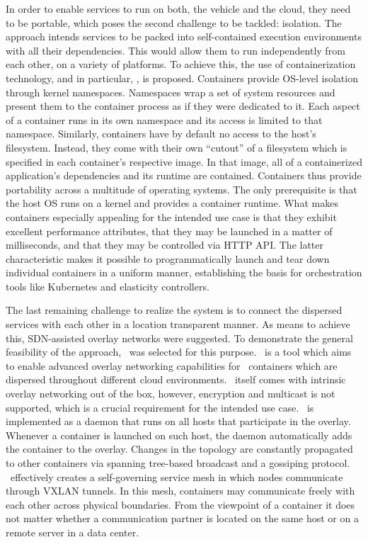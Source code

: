In order to enable services to run on both, the vehicle and the cloud, they need to be portable, which poses the second challenge to be tackled: isolation. The approach intends services to be packed into self-contained execution environments with all their dependencies. This would allow them to run independently from each other, on a variety of platforms. To achieve this, the use of containerization technology, and in particular, \docker , is proposed. Containers provide OS-level isolation through kernel namespaces. Namespaces wrap a set of system resources and present them to the container process as if they were dedicated to it. Each aspect of a container runs in its own namespace and its access is limited to that namespace. Similarly, containers have by default no access to the host's filesystem. Instead, they come with their own ``cutout'' of a filesystem which is specified in each container's respective image. In that image, all of a containerized application's dependencies and its runtime are contained. Containers thus provide portability across a multitude of operating systems. The only prerequisite is that the host OS runs on a kernel and provides a container runtime. What makes containers especially appealing for the intended use case is that they exhibit excellent performance attributes, that they may be launched in a matter of milliseconds, and that they may be controlled via HTTP API. The latter characteristic makes it possible to programmatically launch and tear down individual containers in a uniform manner, establishing the basis for orchestration tools like Kubernetes and elasticity controllers.

The last remaining challenge to realize the system is to connect the dispersed services with each other in a location transparent manner. As means to achieve this, SDN-assisted overlay networks were suggested. To demonstrate the general feasibility of the approach, \wnet\ was selected for this purpose. \wnet\ is a tool which aims to enable advanced overlay networking capabilities for \docker\ containers which are dispersed throughout different cloud environments. \docker\ itself comes with intrinsic overlay networking out of the box, however, encryption and multicast is not supported, which is a crucial requirement for the intended use case. \weave\ is implemented as a daemon that runs on all hosts that participate in the overlay. Whenever a container is launched on such host, the daemon automatically adds the container to the overlay. Changes in the topology are constantly propagated to other containers via spanning tree-based broadcast and a gossiping protocol. \weave\ effectively creates a self-governing service mesh in which nodes communicate through VXLAN tunnels. In this mesh, containers may communicate freely with each other across physical boundaries. From the viewpoint of a container it does not matter whether a communication partner is located on the same host or on a remote server in a data center.

